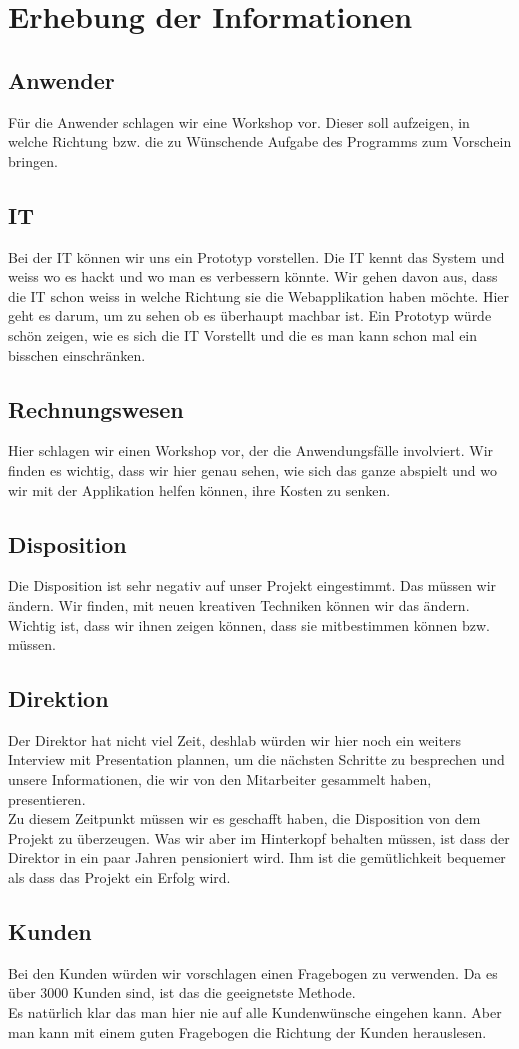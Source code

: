 \section{Erhebung der Informationen}
\subsection{Anwender}
Für die Anwender schlagen wir eine Workshop vor. Dieser soll aufzeigen, in welche Richtung bzw. die zu Wünschende Aufgabe des Programms zum Vorschein bringen.
%
\subsection{IT}
Bei der IT können wir uns ein Prototyp vorstellen. Die IT kennt das System und weiss wo es hackt und wo man es verbessern könnte. Wir gehen davon aus, dass die IT schon weiss in welche Richtung sie die Webapplikation haben möchte. Hier geht es darum, um zu sehen ob es überhaupt machbar ist. Ein Prototyp würde schön zeigen, wie es sich die IT Vorstellt und die es man kann schon mal ein bisschen einschränken.
%
\subsection{Rechnungswesen}
Hier schlagen wir einen Workshop vor, der die Anwendungsfälle involviert. Wir finden es wichtig, dass wir hier genau sehen, wie sich das ganze abspielt und wo wir mit der Applikation helfen können, ihre Kosten zu senken.
%
\subsection{Disposition}
Die Disposition ist sehr negativ auf unser Projekt eingestimmt. Das müssen wir ändern. Wir finden, mit neuen kreativen Techniken können wir das ändern. Wichtig ist, dass wir ihnen zeigen können, dass sie mitbestimmen können bzw. müssen. 
%
\subsection{Direktion}
Der Direktor hat nicht viel Zeit, deshlab würden wir hier noch ein weiters Interview mit Presentation plannen, um die nächsten Schritte zu besprechen und unsere Informationen, die wir von den Mitarbeiter gesammelt haben, presentieren.\\
Zu diesem Zeitpunkt müssen wir es geschafft haben, die Disposition von dem Projekt zu überzeugen. Was wir aber im Hinterkopf behalten müssen, ist dass der Direktor in ein paar Jahren pensioniert wird. Ihm ist die gemütlichkeit bequemer als dass das Projekt ein Erfolg wird.
%
\subsection{Kunden}
Bei den Kunden würden wir vorschlagen einen Fragebogen zu verwenden. Da es über 3000 Kunden sind, ist das die geeignetste Methode.\\
Es natürlich klar das man hier nie auf alle Kundenwünsche eingehen kann. Aber man kann mit einem guten Fragebogen die Richtung der Kunden herauslesen.